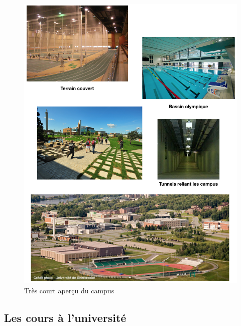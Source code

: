 \begin{figure}[h!]
\centering
\includegraphics[width = 150mm]{figures/Image_Campus}
\caption{Très court aperçu du campus}
\end{figure}



\subsection{Les cours à l’université}\label{sec:sec4.7.1}

